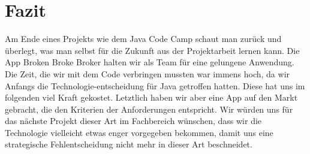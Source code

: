 \documentclass[10pt]{scrartcl}
\begin{document}
	
	
	
\section{Fazit}

Am Ende eines Projekts wie dem Java Code Camp schaut man zurück und überlegt, was man selbst für die Zukunft aus der Projektarbeit lernen kann. Die App Broken Broke Broker halten wir als Team für eine gelungene Anwendung. Die Zeit, die wir mit dem Code verbringen mussten war immens hoch, da wir Anfangs die Technologie-entscheidung für Java getroffen hatten. Diese hat uns im folgenden viel Kraft gekostet. Letztlich haben wir aber eine App auf den Markt gebracht, die den Kriterien der Anforderungen entspricht. Wir würden uns für das nächste Projekt dieser Art im Fachbereich wünschen, dass wir die Technologie vielleicht etwas enger vorgegeben bekommen, damit uns eine strategische Fehlentscheidung nicht mehr in dieser Art beschneidet.

\newpage
\listoffigures
\end{document}
